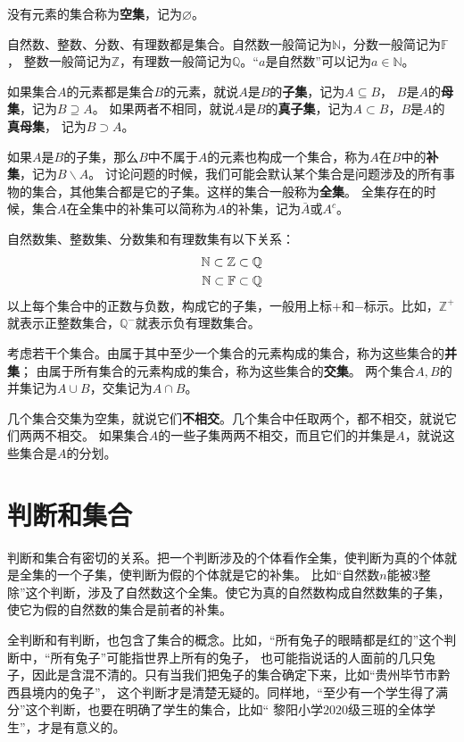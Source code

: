 \documentclass[12pt,UTF8]{ctexbook}
\begin{document}
没有元素的集合称为\textbf{空集}，记为$\varnothing$。

自然数、整数、分数、有理数都是集合。自然数一般简记为$\mathbb{N}$，分数一般简记为$\mathbb{F}$，
整数一般简记为$\mathbb{Z}$，有理数一般简记为$\mathbb{Q}$。“$a$是自然数”可以记为$a\in\mathbb{N}$。

如果集合$A$的元素都是集合$B$的元素，就说$A$是$B$的\textbf{子集}，记为$A\subseteq B$，
$B$是$A$的\textbf{母集}，记为$B\supseteq A$。
如果两者不相同，就说$A$是$B$的\textbf{真子集}，记为$A\subset B$，$B$是$A$的\textbf{真母集}，
记为$B\supset A$。

如果$A$是$B$的子集，那么$B$中不属于$A$的元素也构成一个集合，称为$A$在$B$中的\textbf{补集}，记为$B\backslash A$。
讨论问题的时候，我们可能会默认某个集合是问题涉及的所有事物的集合，其他集合都是它的子集。这样的集合一般称为\textbf{全集}。
全集存在的时候，集合$A$在全集中的补集可以简称为$A$的补集，记为$\bar{A}$或$A^c$。

自然数集、整数集、分数集和有理数集有以下关系：
\begin{align}
    \mathbb{N}\subset\mathbb{Z}\subset\mathbb{Q} \notag \\
    \mathbb{N}\subset\mathbb{F}\subset\mathbb{Q} \notag
\end{align}
以上每个集合中的正数与负数，构成它的子集，一般用上标$+$和$-$标示。比如，$\mathbb{Z}^+$就表示正整数集合，$\mathbb{Q}^-$就表示负有理数集合。

考虑若干个集合。由属于其中至少一个集合的元素构成的集合，称为这些集合的\textbf{并集}；
由属于所有集合的元素构成的集合，称为这些集合的\textbf{交集}。
两个集合$A, B$的并集记为$A\cup B$，交集记为$A\cap B$。

几个集合交集为空集，就说它们\textbf{不相交}。几个集合中任取两个，都不相交，就说它们两两不相交。
如果集合$A$的一些子集两两不相交，而且它们的并集是$A$，就说这些集合是$A$的分划。

\section{判断和集合}
判断和集合有密切的关系。把一个判断涉及的个体看作全集，使判断为真的个体就是全集的一个子集，使判断为假的个体就是它的补集。
比如“自然数$n$能被$3$整除”这个判断，涉及了自然数这个全集。使它为真的自然数构成自然数集的子集，使它为假的自然数的集合是前者的补集。

全判断和有判断，也包含了集合的概念。比如，“所有兔子的眼睛都是红的”这个判断中，“所有兔子”可能指世界上所有的兔子，
也可能指说话的人面前的几只兔子，因此是含混不清的。只有当我们把兔子的集合确定下来，比如“贵州毕节市黔西县境内的兔子”，
这个判断才是清楚无疑的。同样地，“至少有一个学生得了满分”这个判断，也要在明确了学生的集合，比如“
黎阳小学$2020$级三班的全体学生”，才是有意义的。
\end{document}
